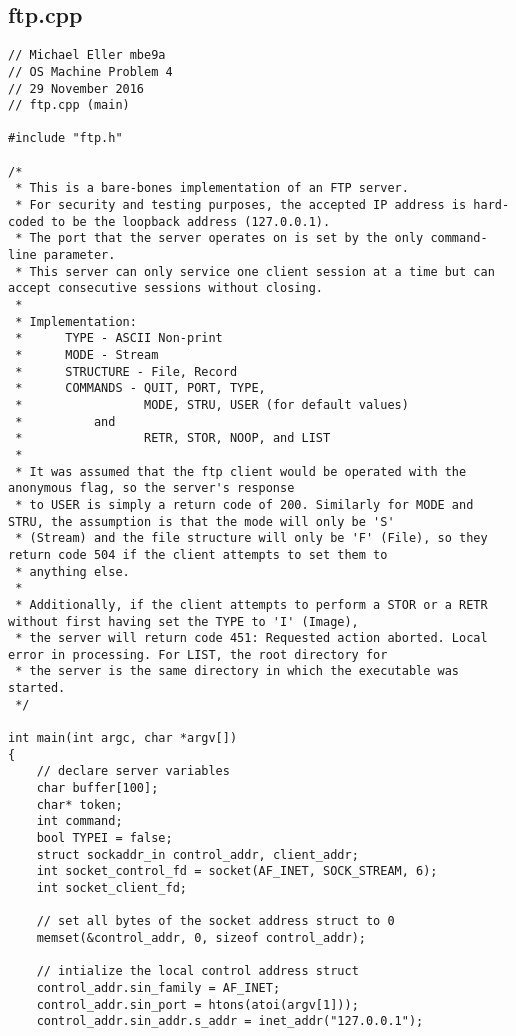\documentclass[12pt,letter,titlepage]{article}
\begin{document}
\subsection*{ftp.cpp}{
\scriptsize{
\begin{verbatim}
// Michael Eller mbe9a
// OS Machine Problem 4
// 29 November 2016
// ftp.cpp (main)

#include "ftp.h"

/*
 * This is a bare-bones implementation of an FTP server.
 * For security and testing purposes, the accepted IP address is hard-coded to be the loopback address (127.0.0.1).
 * The port that the server operates on is set by the only command-line parameter.
 * This server can only service one client session at a time but can accept consecutive sessions without closing.
 *
 * Implementation:
 *		TYPE - ASCII Non-print
 *		MODE - Stream
 *		STRUCTURE - File, Record
 *		COMMANDS - QUIT, PORT, TYPE,
 *				   MODE, STRU, USER (for default values)
 *			and
 *				   RETR, STOR, NOOP, and LIST
 *
 * It was assumed that the ftp client would be operated with the anonymous flag, so the server's response
 * to USER is simply a return code of 200. Similarly for MODE and STRU, the assumption is that the mode will only be 'S'
 * (Stream) and the file structure will only be 'F' (File), so they return code 504 if the client attempts to set them to
 * anything else.
 *
 * Additionally, if the client attempts to perform a STOR or a RETR without first having set the TYPE to 'I' (Image),
 * the server will return code 451: Requested action aborted. Local error in processing. For LIST, the root directory for
 * the server is the same directory in which the executable was started.
 */

int main(int argc, char *argv[])
{
	// declare server variables
	char buffer[100];
	char* token;
	int command;
	bool TYPEI = false;
	struct sockaddr_in control_addr, client_addr;
	int socket_control_fd = socket(AF_INET, SOCK_STREAM, 6);
	int socket_client_fd;

	// set all bytes of the socket address struct to 0
	memset(&control_addr, 0, sizeof control_addr);

	// intialize the local control address struct
	control_addr.sin_family = AF_INET;
	control_addr.sin_port = htons(atoi(argv[1]));
	control_addr.sin_addr.s_addr = inet_addr("127.0.0.1");
	
\end{verbatim}
\pagebreak
\begin{verbatim}


\end{verbatim}}}
\end{document}
